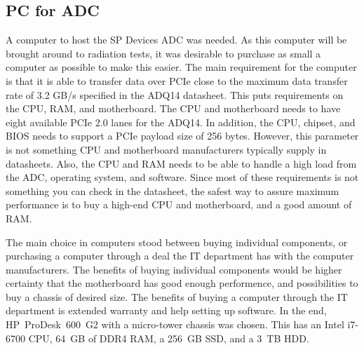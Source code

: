 \documentclass[../main/thesis.tex]{subfiles}
\begin{document}
\subsection{PC for ADC}
\label{e-adc-pc}
A computer to host the SP Devices \gls{ADC} was needed. As this computer will be brought around to radiation tests, it was desirable to purchase as small a computer as possible to make this easier. The main requirement for the computer is that it is able to transfer data over \gls{PCIe} close to the maximum data transfer rate of 3.2 GB/s specified in the ADQ14 datasheet. This puts requirements on the CPU, RAM, and motherboard. The CPU and motherboard needs to have eight available \gls{PCIe} 2.0 lanes for the ADQ14. In addition, the CPU, chipset, and BIOS needs to support a \gls{PCIe} payload size of 256 bytes. However, this parameter is not something CPU and motherboard manufacturers typically supply in datasheets. Also, the CPU and RAM needs to be able to handle a high load from the ADC, operating system, and software. Since most of these requirements is not something you can check in the datasheet, the safest way to assure maximum performance is to buy a high-end CPU and motherboard, and a good amount of RAM.

The main choice in computers stood between buying individual components, or purchasing a computer through a deal the IT department has with the computer manufacturers. The benefits of buying individual components would be higher certainty that the motherboard has good enough performence, and possibilities to buy a chassis of desired size. The benefits of buying a computer through the IT department is extended warranty and help setting up software. In the end, HP~ProDesk~600~G2 with a micro-tower chassis was chosen. This has an Intel i7-6700 CPU, 64~GB of DDR4 RAM, a 256~GB SSD, and a 3~TB HDD. 
\end{document}
